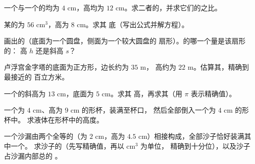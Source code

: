 \begin{exercise}[$\star$]\label{exo:g8:solids:4}
一个与一个的均为 $4$ cm，高均为
$12$ cm。求二者的，并求它们的之比。
\end{exercise}

\begin{exercise}[$\star$]\label{exo:g8:solids:5}
某的为 $56$ cm$^3$，高为 $8$ cm。求其
底（写出公式并解方程）。
\end{exercise}

\begin{exercise}[$\star$]\label{exo:g8:solids:6}
画出的（底面为一个圆盘，侧面为一个较大圆盘的
扇形）。的哪一个量是该扇形的：
高 $h$ 还是斜高
$s$？
\end{exercise}

\begin{exercise}[$\star\star$]\label{exo:g8:solids:7}
卢浮宫金字塔的底面为正方形，边长约为 $35$ m，
高约为 $22$ m。估算其，精确到最接近的
百立方米。
\end{exercise}

\begin{exercise}[$\star\star$]\label{exo:g8:solids:8}
一个的斜高为 $13$ cm，底面为 $5$ cm。求其
高，再求其（用 $\pi$ 表示精确值）。
\end{exercise}

\begin{exercise}[$\star\star$]\label{exo:g8:solids:9}
一个为 $4$ cm、高为 $9$ cm 的形杯，装满至杯口，
然后全部倒入一个为 $4$ cm 的形杯中。
求液体在形杯中的高度。
\end{exercise}

\begin{exercise}[$\star\star$]\label{exo:g8:solids:10}
一个沙漏由两个全等的（为 $2$ cm，高为
$4.5$ cm）相接构成，全部沙子恰好装满其中一个。
求沙子的（先写精确值，再以 cm$^3$ 为单位，
精确到十分位），以及沙子占沙漏内部总的
。
\end{exercise}

